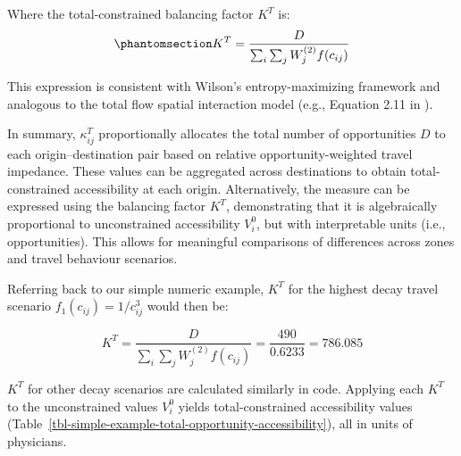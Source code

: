 \documentclass[
  10pt,
  letterpaper,
]{article}
\begin{document}
Where the total-constrained balancing factor \(K^T\) is:
\begin{equation}\phantomsection\label{eq-total-opportunity-balancing-factor}{
K^T = \frac{D}{\sum_i\sum_j W^{(2)}_jf(c_{ij})}
}\end{equation}

This expression is consistent with Wilson's entropy-maximizing framework
and analogous to the total flow spatial interaction model (e.g.,
Equation 2.11 in \citep{cliff_evaluating_1974}).

In summary, \(\kappa_{ij}^T\) proportionally allocates the total number
of opportunities \(D\) to each origin--destination pair based on
relative opportunity-weighted travel impedance. These values can be
aggregated across destinations to obtain total-constrained accessibility
at each origin. Alternatively, the measure can be expressed using the
balancing factor \(K^T\), demonstrating that it is algebraically
proportional to unconstrained accessibility \(V_i^0\), but with
interpretable units (i.e., opportunities). This allows for meaningful
comparisons of differences across zones and travel behaviour scenarios.

Referring back to our simple numeric example, \(K^T\) for the highest
decay travel scenario \(f_1(c_{ij}) = 1/c_{ij}^3\) would then be:

\[
K^T = \frac{D}{\sum_{i}\sum_{j} W_j^{(2)} f(c_{ij})} = \frac{490}{0.6233} = 786.085
\]

\(K^T\) for other decay scenarios are calculated similarly in code.
Applying each \(K^T\) to the unconstrained values \(V_i^0\) yields
total-constrained accessibility values
(Table~\ref{tbl-simple-example-total-opportunity-accessibility}), all in
units of physicians.
\end{document}
